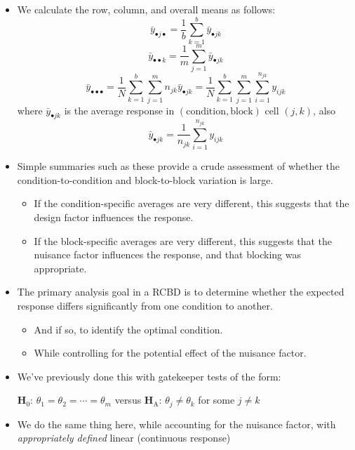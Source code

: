 \begin{itemize}
\begin{itemize}
            \end{itemize}
      \item We calculate the row, column, and overall means as follows:
            \[ \bar{y}_{\bullet j\bullet}=\frac{1}{b} \sum_{k=1}^{b} \bar{y}_{\bullet jk} \]
            \[ \bar{y}_{\bullet\bullet k}=\frac{1}{m} \sum_{j=1}^{m} \bar{y}_{\bullet jk} \]
            \[ \bar{y}_{\bullet\bullet\bullet}=\frac{1}{N} \sum_{k=1}^{b} \sum_{j=1}^{m} n_{jk}\bar{y}_{\bullet jk}=\frac{1}{N} \sum_{k=1}^{b} \sum_{j=1}^{m} \sum_{i=1}^{n_{jk}} y_{ijk} \]
            where $ \bar{y}_{\bullet jk} $ is the average response in $  (\text{condition}, \text{block}) $ cell $ (j, k) $, also
            \[ \bar{y}_{\bullet jk}=\frac{1}{n_{jk}} \sum_{i=1}^{n_{jk}} y_{ijk} \]
      \item Simple summaries such as these provide a crude assessment of whether the condition-to-condition and
            block-to-block variation is large.
            \begin{itemize}
                  \item If the condition-specific averages are very different, this suggests that the design factor influences the response.
                  \item If the block-specific averages are very different, this suggests that the nuisance factor influences the response, and that blocking was appropriate.
            \end{itemize}
      \item The primary analysis goal in a RCBD is to determine whether the expected response differs significantly
            from one condition to another.
            \begin{itemize}
                  \item And if so, to identify the optimal condition.
                  \item While controlling for the potential effect of the nuisance factor.
            \end{itemize}
      \item We've previously done this with gatekeeper tests of the form:
            \begin{tightcenter}
                  $ \mathbf{H}_0 $: $ \theta_1=\theta_2=\cdots=\theta_m $ versus $ \mathbf{H}_\text{A} $: $ \theta_j\ne \theta_k $ for some $ j\ne k $
            \end{tightcenter}
      \item We do the same thing here, while accounting for the nuisance factor, with \emph{appropriately defined} linear (continuous response)

\end{itemize}
